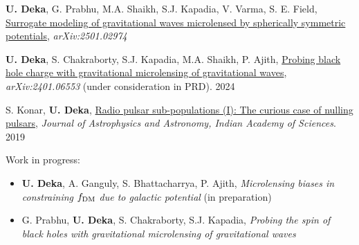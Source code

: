 \begin{itemize}[noitemsep]
{
\item\textbf{U. Deka}, G. Prabhu, M.A. Shaikh, S.J. Kapadia, V. Varma, S. E. Field, \href{https://arxiv.org/abs/2501.02974}{Surrogate modeling of gravitational waves microlensed by spherically symmetric potentials}, \textit{arXiv:2501.02974}
\item \textbf{U. Deka}, S. Chakraborty, S.J. Kapadia, M.A. Shaikh, P. Ajith, \href{https://arxiv.org/pdf/2401.06553}{Probing black hole charge with gravitational microlensing of gravitational waves}, \textit{arXiv:2401.06553} (under consideration in PRD). \hfill  2024
    
\item S. Konar, \textbf{U. Deka}, \href{https://www.ias.ac.in/article/fulltext/joaa/040/05/0042}{Radio pulsar sub-populations (I): The curious case of nulling pulsars}, \textit{Journal of Astrophysics and Astronomy, Indian Academy of Sciences}. \hfill 2019

\item Work in progress:
    \begin{itemize}
    \item\textbf{U. Deka}, A. Ganguly, S. Bhattacharrya, P. Ajith, \textit{Microlensing biases in constraining $f_{\rm DM}$ due to galactic potential} (in preparation)
    \item G. Prabhu, \textbf{U. Deka}, S. Chakraborty, S.J. Kapadia, \textit{Probing the spin of black holes with gravitational microlensing of gravitational waves}
    \end{itemize}
}\end{itemize}